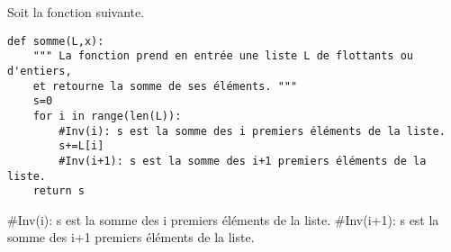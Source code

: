 Soit la fonction suivante.
\begin{lstlisting}
def somme(L,x):
    """ La fonction prend en entrée une liste L de flottants ou d'entiers,
    et retourne la somme de ses éléments. """
    s=0
    for i in range(len(L)):
        #Inv(i): s est la somme des i premiers éléments de la liste.
        s+=L[i]
        #Inv(i+1): s est la somme des i+1 premiers éléments de la liste.
    return s
\end{lstlisting}

\ifprof
\begin{corrige}
#Inv(i): s est la somme des i premiers éléments de la liste.
#Inv(i+1): s est la somme des i+1 premiers éléments de la liste.
\end{corrige}
\else
\fi